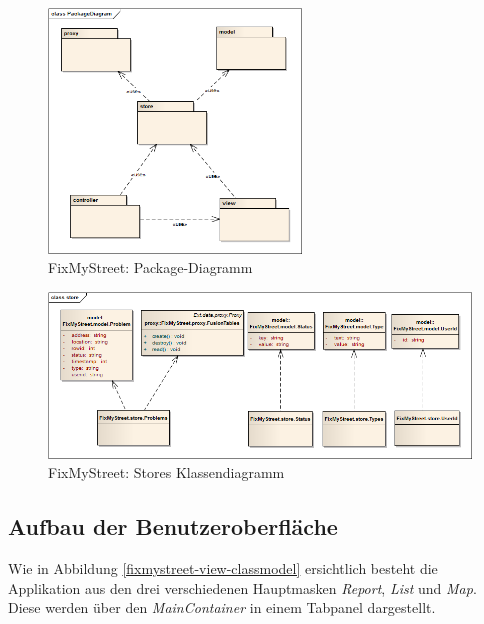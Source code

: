 \begin{figure}[H]
	\centering
	\includegraphics[width=0.6\textwidth]{images/usecase2-fixmystreet/uml/fixmystreet-packagediagram}
	\caption{FixMyStreet: Package-Diagramm}
	\label{fixmystreet-packagediagram}
\end{figure}

\begin{figure}[H]
	\centering
	\includegraphics[width=\textwidth]{images/usecase2-fixmystreet/uml/fixmystreet-store-classmodel}
	\caption{FixMyStreet: Stores Klassendiagramm}
	\label{fixmystreet-store-classmodel}
\end{figure}

\subsection{Aufbau der Benutzeroberfläche}
Wie in Abbildung \ref{fixmystreet-view-classmodel} ersichtlich besteht die Applikation aus den drei verschiedenen Hauptmasken \emph{Report}, \emph{List} und \emph{Map}. Diese werden über den \emph{MainContainer} in einem Tabpanel dargestellt.

